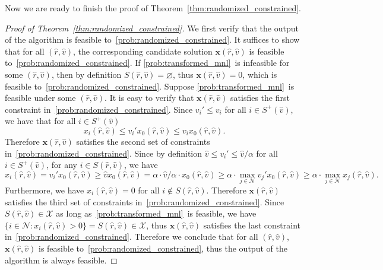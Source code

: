 \documentclass[mnsc,non-blindrev]{informs3}
\theoremstyle{definition}
\begin{document}
Now we are ready to finish the proof of Theorem~\ref{thm:randomized_constrained}.

\begin{proof}[Proof of Theorem~\ref{thm:randomized_constrained}]

We first verify that the output of the algorithm is feasible to~\ref{prob:randomized_constrained}. It suffices to show that for all $(\hat{r},\hat{v})$, the corresponding candidate solution $\bm{x}(\hat{r},\hat{v})$ is feasible to~\ref{prob:randomized_constrained}. If \ref{prob:transformed_mnl}~is infeasible for some $(\hat{r},\hat{v})$, then by definition $S(\hat{r},\hat{v})=\varnothing$, thus $\bm{x}(\hat{r},\hat{v})=0$, which is feasible to~\ref{prob:randomized_constrained}. Suppose \ref{prob:transformed_mnl}~is feasible under some $(\hat{r},\hat{v})$. It is easy to verify that $\bm{x}(\hat{r},\hat{v})$ satisfies the first constraint in~\ref{prob:randomized_constrained}. Since $v_i'\leq v_i$ for all $i\in S^+(\hat{v})$, we have that for all $i\in S^+(\hat{v})$
\begin{equation*}
x_i(\hat{r},\hat{v})\leq v_i'x_0(\hat{r},\hat{v})\leq v_ix_0(\hat{r},\hat{v}).
\end{equation*}
Therefore $\bm{x}(\hat{r},\hat{v})$ satisfies the second set of constraints in~\ref{prob:randomized_constrained}. Since by definition \mbox{$\hat{v}\leq v_i'\leq \hat{v}/\alpha$} for all $i\in S^+(\hat{v})$, for any $i\in S(\hat{r},\hat{v})$, we have
\begin{equation*}
x_i(\hat{r},\hat{v})=v_i'x_0(\hat{r},\hat{v})\geq \hat{v}x_0(\hat{r},\hat{v})=\alpha\cdot\hat{v}/\alpha\cdot x_0(\hat{r},\hat{v})\geq \alpha\cdot\max_{j\in\mathcal{N}} v_j'x_0(\hat{r},\hat{v})\geq \alpha\cdot\max_{j\in\mathcal{N}}x_j(\hat{r},\hat{v}).
\end{equation*}
Furthermore, we have $x_i(\hat{r},\hat{v})=0$ for all $i\notin S(\hat{r},\hat{v})$. Therefore $\bm{x}(\hat{r},\hat{v})$ satisfies the third set of constraints in~\ref{prob:randomized_constrained}. Since $S(\hat{r},\hat{v})\in \mathcal{X}$ as long as~\ref{prob:transformed_mnl}~is feasible, we have \mbox{$\{i\in\mathcal{N}:x_i(\hat{r},\hat{v})>0\}=S(\hat{r},\hat{v})\in\mathcal{X}$,} thus $\bm{x}(\hat{r},\hat{v})$ satisfies the last constraint in~\ref{prob:randomized_constrained}. Therefore we conclude that for all $(\hat{r},\hat{v})$, $\bm{x}(\hat{r},\hat{v})$ is feasible to~\ref{prob:randomized_constrained}, thus the output of the algorithm is always feasible.


\end{proof}
\end{document}
